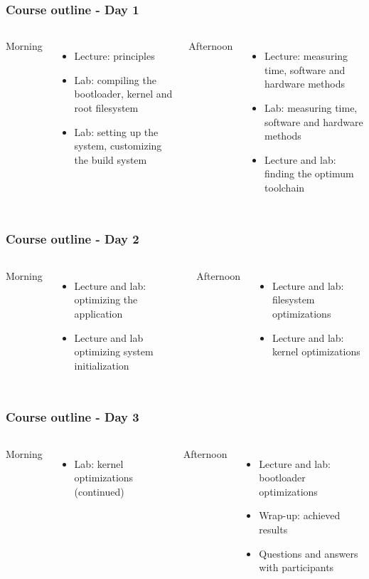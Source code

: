 \begin{frame}
\frametitle{Course outline - Day 1}
\begin{columns}
Morning
  \begin{itemize}
    \item Lecture: principles
    \item Lab: compiling the bootloader, kernel and root filesystem
    \item Lab: setting up the system, customizing the build system
\end{itemize}
  Afternoon
  \begin{itemize}
    \item Lecture: measuring time, software and hardware methods
    \item Lab: measuring time, software and hardware methods
    \item Lecture and lab: finding the optimum toolchain
  \end{itemize}
\end{columns}
\end{frame}

\begin{frame}
\frametitle{Course outline - Day 2}
\begin{columns}
Morning
  \begin{itemize}
    \item Lecture and lab: optimizing the application
    \item Lecture and lab optimizing system initialization
\end{itemize}
  Afternoon
  \begin{itemize}
    \item Lecture and lab: filesystem optimizations
    \item Lecture and lab: kernel optimizations
  \end{itemize}
\end{columns}
\end{frame}

\begin{frame}
\frametitle{Course outline - Day 3}
\begin{columns}
Morning
  \begin{itemize}
    \item Lab: kernel optimizations (continued)
\end{itemize}
  Afternoon
  \begin{itemize}
    \item Lecture and lab: bootloader optimizations
    \item Wrap-up: achieved results
    \item Questions and answers with participants
  \end{itemize}
\end{columns}
\end{frame}

